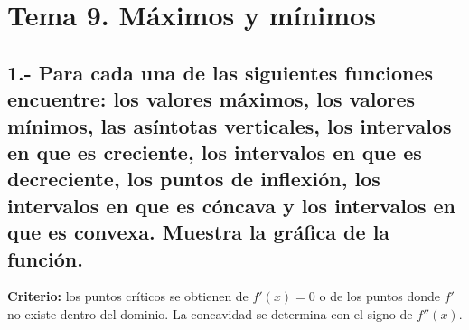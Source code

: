 \documentclass[12pt, letterpaper]{article}
\begin{document}

\newpage
\section{Tema 9. Máximos y mínimos}

\subsection*{1.- Para cada una de las siguientes funciones encuentre: los valores máximos, los valores mínimos, las asíntotas verticales, los intervalos en que es creciente, los intervalos en que es decreciente, los puntos de inflexión, los intervalos en que es cóncava y los intervalos en que es convexa. Muestra la gráfica de la función.}

\textbf{Criterio:} los puntos críticos se obtienen de $f'(x)=0$ o de los puntos donde $f'$ no existe dentro del dominio. La concavidad se determina con el signo de $f''(x)$.
\end{document}
